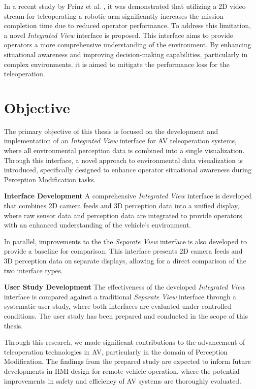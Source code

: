 In a recent study by Prinz et al. \cite{vizualizationUserStudy}, it was demonstrated that utilizing a 2D video stream for teleoperating a robotic arm
significantly increases the mission completion time due to reduced operator performance. To address this limitation,
a novel \emph{Integrated View} interface is proposed. This interface aims to provide operators a more comprehensive understanding of the environment.
By enhancing situational awareness and improving decision-making capabilities, particularly in complex environments, it is aimed to mitigate the performance
loss for the teleoperation.

\section{Objective}
The primary objective of this thesis is focused on the development and implementation of an \emph{Integrated View} interface for \ac{AV} teleoperation systems, where all environmental perception data is combined into a single visualization. Through this interface, a novel approach to environmental data visualization is introduced, specifically designed to enhance operator situational awareness during Perception Modification tasks.

\textbf{Interface Development} A comprehensive \emph{Integrated View} interface is developed that combines 2D camera feeds and 3D perception data into a unified display, where raw sensor data and perception data are integrated to provide operators with an enhanced understanding of the vehicle's environment.

In parallel, improvements to the the \emph{Separate View} interface is also developed to provide a baseline for comparison. This interface presents 2D camera feeds and 3D perception data on separate displays, allowing for a direct comparison of the two interface types.

\textbf{User Study Development} The effectiveness of the developed \emph{Integrated View} interface is compared against a traditional \emph{Separate View} interface through a systematic user study, where both interfaces are evaluated under controlled conditions. The user study has been prepared and conducted in the scope of this thesis.

Through this research, we made significant contributions to the advancement of teleoperation technologies in \ac{AV}, particularly in the domain of Perception Modification. The findings from the prepared study are expected to inform future developments in \ac{HMI} design for remote vehicle operation, where the potential improvements in safety and efficiency of \ac{AV} systems are thoroughly evaluated.

